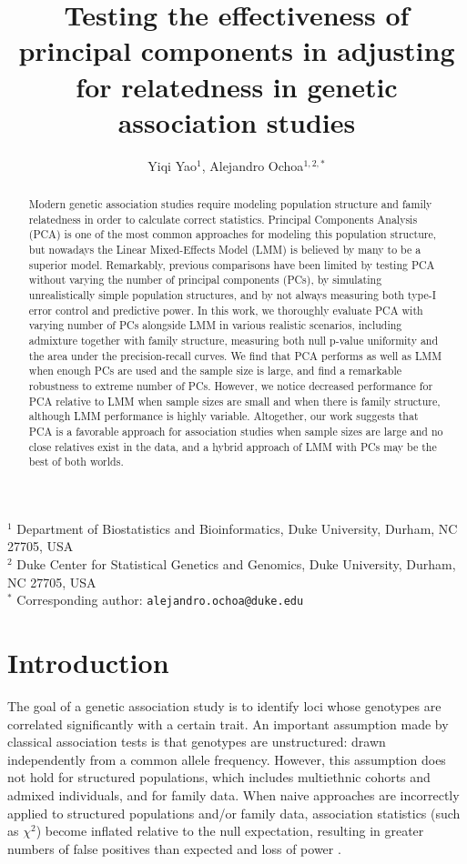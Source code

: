 \documentclass[11pt]{article}
\title{\Large \textbf{Testing the effectiveness of principal components in adjusting for relatedness in genetic association studies}}
\author{Yiqi Yao$^1$, Alejandro Ochoa$^{1,2,*}$}
\date{}
\begin{document}
\maketitle

\noindent
$^1$ Department of Biostatistics and Bioinformatics, Duke University, Durham, NC 27705, USA \\
$^2$ Duke Center for Statistical Genetics and Genomics, Duke University, Durham, NC 27705, USA \\
$^*$ Corresponding author: \texttt{alejandro.ochoa@duke.edu}


\begin{abstract}
  Modern genetic association studies require modeling population structure and family relatedness in order to calculate correct statistics.
  Principal Components Analysis (PCA) is one of the most common approaches for modeling this population structure, but nowadays the Linear Mixed-Effects Model (LMM) is believed by many to be a superior model.
  Remarkably, previous comparisons have been limited by testing PCA without varying the number of principal components (PCs), by simulating unrealistically simple population structures, and by not always measuring both type-I error control and predictive power.
  In this work, we thoroughly evaluate PCA with varying number of PCs alongside LMM in various realistic scenarios, including admixture together with family structure, measuring both null p-value uniformity and the area under the precision-recall curves.
  We find that PCA performs as well as LMM when enough PCs are used and the sample size is large, and find a remarkable robustness to extreme number of PCs.
  However, we notice decreased performance for PCA relative to LMM when sample sizes are small and when there is family structure, although LMM performance is highly variable.
  Altogether, our work suggests that PCA is a favorable approach for association studies when sample sizes are large and no close relatives exist in the data, and a hybrid approach of LMM with PCs may be the best of both worlds.
\end{abstract}



\clearpage
	
\section{Introduction} 

The goal of a genetic association study is to identify loci whose genotypes are correlated significantly with a certain trait.
An important assumption made by classical association tests is that genotypes are unstructured: drawn independently from a common allele frequency.
However, this assumption does not hold for structured populations, which includes multiethnic cohorts and admixed individuals, and for family data.
When naive approaches are incorrectly applied to structured populations and/or family data, association statistics (such as $\chi^2$) become inflated relative to the null expectation, resulting in greater numbers of false positives than expected and loss of power \citep{devlin_genomic_1999, voight_confounding_2005, astle_population_2009}.
\end{document}
